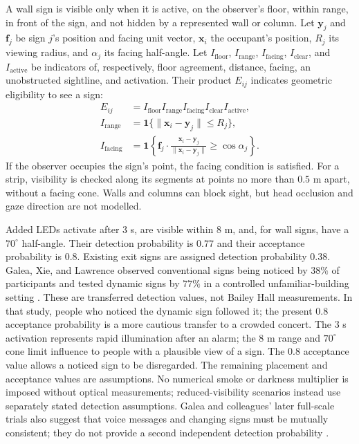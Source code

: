 \documentclass[11pt,a4paper]{article}
\newcommand{\ind}{\mathbf{1}}
\begin{document}
A wall sign is visible only when it is active, on the observer's floor, within range, in front of the sign, and not hidden by a represented wall or column. Let $\mathbf y_j$ and $\mathbf f_j$ be sign $j$'s position and facing unit vector, $\mathbf x_i$ the occupant's position, $R_j$ its viewing radius, and $\alpha_j$ its facing half-angle. Let $I_{\mathrm{floor}}$, $I_{\mathrm{range}}$, $I_{\mathrm{facing}}$, $I_{\mathrm{clear}}$, and $I_{\mathrm{active}}$ be indicators of, respectively, floor agreement, distance, facing, an unobstructed sightline, and activation. Their product $E_{ij}$ indicates geometric eligibility to see a sign:
\begin{align}\label{eq:visibility}
E_{ij}&=I_{\mathrm{floor}}I_{\mathrm{range}}I_{\mathrm{facing}}I_{\mathrm{clear}}I_{\mathrm{active}},\\
I_{\mathrm{range}}&=\ind\{\|\mathbf x_i-\mathbf y_j\|\leq R_j\},\\
I_{\mathrm{facing}}&=\ind\!\left\{\mathbf f_j\cdot
\frac{\mathbf x_i-\mathbf y_j}{\|\mathbf x_i-\mathbf y_j\|}\geq\cos\alpha_j\right\}.
\end{align}
If the observer occupies the sign's point, the facing condition is satisfied. For a strip, visibility is checked along its segments at points no more than $0.5$ m apart, without a facing cone. Walls and columns can block sight, but head occlusion and gaze direction are not modelled.

Added LEDs activate after $3$ s, are visible within $8$ m, and, for wall signs, have a $70^\circ$ half-angle. Their detection probability is $0.77$ and their acceptance probability is $0.8$. Existing exit signs are assigned detection probability $0.38$. Galea, Xie, and Lawrence observed conventional signs being noticed by $38\%$ of participants and tested dynamic signs by $77\%$ in a controlled unfamiliar-building setting \cite{galea2014}. These are transferred detection values, not Bailey Hall measurements. In that study, people who noticed the dynamic sign followed it; the present $0.8$ acceptance probability is a more cautious transfer to a crowded concert. The $3$ s activation represents rapid illumination after an alarm; the $8$ m range and $70^\circ$ cone limit influence to people with a plausible view of a sign. The $0.8$ acceptance value allows a noticed sign to be disregarded. The remaining placement and acceptance values are assumptions. No numerical smoke or darkness multiplier is imposed without optical measurements; reduced-visibility scenarios instead use separately stated detection assumptions. Galea and colleagues' later full-scale trials also suggest that voice messages and changing signs must be mutually consistent; they do not provide a second independent detection probability \cite{galea2017}.
\end{document}
